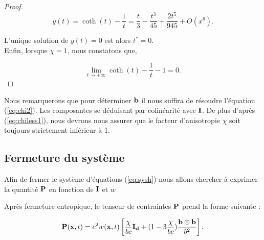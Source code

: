\begin{proof}
$$
y(t) = \coth(t) - \frac{1}{t} = \frac{t}{3} - \frac{t^3}{45} + \frac{2t^5}{945} + O(x^6).$$

L'unique solution de $y(t) = 0$ est alors $t^*=0$.\\


Enfin, lorsque $\chi=1$, nous constatons que, 

\begin{equation}
\label{eq:chiless1}
\lim_{t\to +\infty} \coth(t) - \frac{1}{t}  - 1 = 0.
\end{equation}
\end{proof}


\begin{remark}
Nous remarquerons que pour déterminer $\mathbf{b}$ il nous suffira de résoudre
l'équation (\ref{eq:chi2}). Les composantes se déduisant par colinéarité 
avec $\mathbf{I}$. De plus d'après (\ref{eq:chiless1}), nous devrons nous assurer 
que le facteur d'anisotropie $\chi$ soit toujours strictement inférieur à 1. 
\end{remark}



 
\subsection{Fermeture du système}

Afin de fermer le système d'équations (\ref{eq:sysh}) nous allons chercher 
à exprimer la quantité $\mathbf{P}$ en fonction de $\mathbf{I}$ et $w$


\begin{proposition}
Après fermeture entropique, le tenseur de contraintes $\mathbf{P}$ prend la forme 
suivante :

\begin{equation}
  \mathbf{P}(\mathbf{x},t) =  c^2 w(\mathbf{x},t) \left[\frac{\chi}{bc} \mathbf{I_d} + 
  ( 1 - 3\frac{\chi}{bc}) \frac{\mathbf{b} \otimes \mathbf{b}}{b^2} \right].
\end{equation}

\end{proposition}

